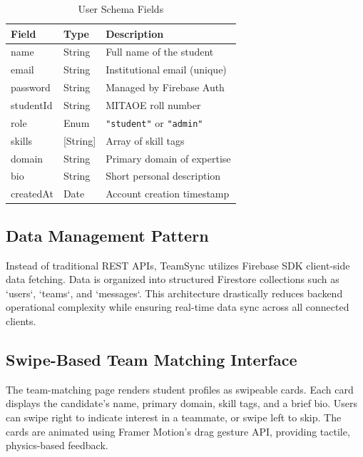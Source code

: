 \documentclass[conference]{IEEEtran}
\begin{document}
\begin{table}[htbp]
\caption{User Schema Fields}
\label{tab:schema}
\centering
\begin{tabular}{|p{}|p{}|p{}|}
\hline
\textbf{Field} & \textbf{Type} & \textbf{Description} \\
\hline
name & String & Full name of the student \\
\hline
email & String & Institutional email (unique) \\
\hline
password & String & Managed by Firebase Auth \\
\hline
studentId & String & MITAOE roll number \\
\hline
role & Enum & \texttt{"student"} or \texttt{"admin"} \\
\hline
skills & {[}String{]} & Array of skill tags \\
\hline
domain & String & Primary domain of expertise \\
\hline
bio & String & Short personal description \\
\hline
createdAt & Date & Account creation timestamp \\
\hline
\end{tabular}
\end{table}

\subsection{Data Management Pattern}
Instead of traditional REST APIs, TeamSync utilizes Firebase SDK client-side data fetching. Data is organized into structured Firestore collections such as `users`, `teams`, and `messages`. This architecture drastically reduces backend operational complexity while ensuring real-time data sync across all connected clients.

\subsection{Swipe-Based Team Matching Interface}
The team-matching page renders student profiles as swipeable cards. Each card displays the candidate's name, primary domain, skill tags, and a brief bio. Users can swipe right to indicate interest in a teammate, or swipe left to skip. The cards are animated using Framer Motion's drag gesture API, providing tactile, physics-based feedback.
\end{document}

